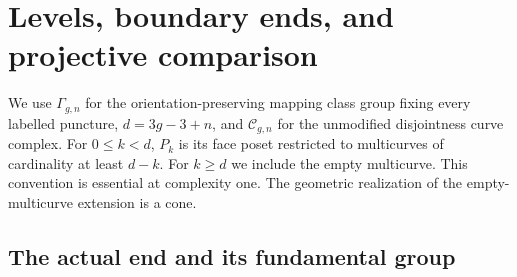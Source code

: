 \section{Levels, boundary ends, and projective comparison}
\label{sec:D}

We use $\Gamma_{g,n}$ for the orientation-preserving mapping class group fixing every labelled puncture, $d=3g-3+n$, and $\mathcal C_{g,n}$ for the unmodified disjointness curve complex. For $0\leq k<d$, $P_k$ is its face poset restricted to multicurves of cardinality at least $d-k$. For $k\geq d$ we include the empty multicurve. This convention is essential at complexity one. The geometric realization of the empty-multicurve extension is a cone.

\subsection{The actual end and its fundamental group}

